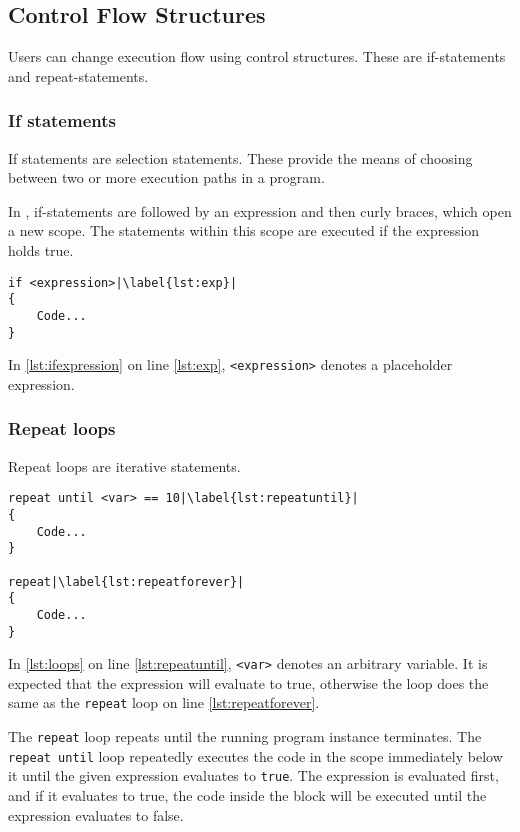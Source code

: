 \subsection{Control Flow Structures}
Users can change execution flow using control structures. These are if-statements and repeat-statements.
\subsubsection{If statements}
If statements are selection statements. These provide the means of choosing between two or more execution paths in a program\cite{sebesta_concepts_2016}.

In \dazel{}, if-statements are followed by an expression and then curly braces, which open a new scope. The statements within this scope are executed if the expression holds true.

\begin{lstlisting}[language=CSharp, caption={Example of an if statement}, label={lst:ifexpression},escapechar=|]
if <expression>|\label{lst:exp}|
{
    Code...
}
\end{lstlisting}

In \ref{lst:ifexpression} on line \ref{lst:exp},  \verb|<expression>| denotes a placeholder expression.

\subsubsection{Repeat loops}
Repeat loops are iterative statements.

\begin{lstlisting}[caption={Example of loops}, label={lst:loops},escapechar=|]
repeat until <var> == 10|\label{lst:repeatuntil}|
{
    Code...
}

repeat|\label{lst:repeatforever}|
{
    Code...
}
\end{lstlisting}

In \ref{lst:loops} on line \ref{lst:repeatuntil}, \verb|<var>| denotes an arbitrary variable. It is expected that the expression will evaluate to true, otherwise the loop does the same as the \verb|repeat| loop on line \ref{lst:repeatforever}.

The \verb|repeat| loop repeats until the running program instance terminates.
The \verb|repeat until| loop repeatedly executes the code in the scope immediately below it until the given expression evaluates to \verb|true|.
The expression is evaluated first, and if it evaluates to true, the code inside the block will be executed until the expression evaluates to false.